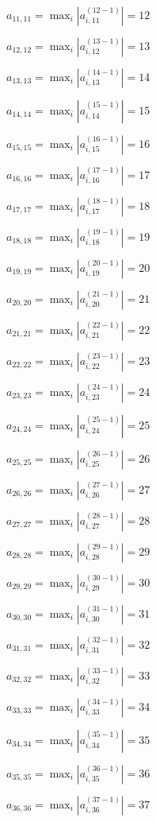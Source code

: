 \documentclass[a4paper,12pt]{article}
\begin{document}
$a _{ 11, 11 } =  \max _i |a _{ i, 11 } ^{ (12 - 1) } | = 12$

$a _{ 12, 12 } =  \max _i |a _{ i, 12 } ^{ (13 - 1) } | = 13$

$a _{ 13, 13 } =  \max _i |a _{ i, 13 } ^{ (14 - 1) } | = 14$

$a _{ 14, 14 } =  \max _i |a _{ i, 14 } ^{ (15 - 1) } | = 15$

$a _{ 15, 15 } =  \max _i |a _{ i, 15 } ^{ (16 - 1) } | = 16$

$a _{ 16, 16 } =  \max _i |a _{ i, 16 } ^{ (17 - 1) } | = 17$

$a _{ 17, 17 } =  \max _i |a _{ i, 17 } ^{ (18 - 1) } | = 18$

$a _{ 18, 18 } =  \max _i |a _{ i, 18 } ^{ (19 - 1) } | = 19$

$a _{ 19, 19 } =  \max _i |a _{ i, 19 } ^{ (20 - 1) } | = 20$

$a _{ 20, 20 } =  \max _i |a _{ i, 20 } ^{ (21 - 1) } | = 21$

$a _{ 21, 21 } =  \max _i |a _{ i, 21 } ^{ (22 - 1) } | = 22$

$a _{ 22, 22 } =  \max _i |a _{ i, 22 } ^{ (23 - 1) } | = 23$

$a _{ 23, 23 } =  \max _i |a _{ i, 23 } ^{ (24 - 1) } | = 24$

$a _{ 24, 24 } =  \max _i |a _{ i, 24 } ^{ (25 - 1) } | = 25$

$a _{ 25, 25 } =  \max _i |a _{ i, 25 } ^{ (26 - 1) } | = 26$

$a _{ 26, 26 } =  \max _i |a _{ i, 26 } ^{ (27 - 1) } | = 27$

$a _{ 27, 27 } =  \max _i |a _{ i, 27 } ^{ (28 - 1) } | = 28$

$a _{ 28, 28 } =  \max _i |a _{ i, 28 } ^{ (29 - 1) } | = 29$

$a _{ 29, 29 } =  \max _i |a _{ i, 29 } ^{ (30 - 1) } | = 30$

$a _{ 30, 30 } =  \max _i |a _{ i, 30 } ^{ (31 - 1) } | = 31$

$a _{ 31, 31 } =  \max _i |a _{ i, 31 } ^{ (32 - 1) } | = 32$

$a _{ 32, 32 } =  \max _i |a _{ i, 32 } ^{ (33 - 1) } | = 33$

$a _{ 33, 33 } =  \max _i |a _{ i, 33 } ^{ (34 - 1) } | = 34$

$a _{ 34, 34 } =  \max _i |a _{ i, 34 } ^{ (35 - 1) } | = 35$

$a _{ 35, 35 } =  \max _i |a _{ i, 35 } ^{ (36 - 1) } | = 36$

$a _{ 36, 36 } =  \max _i |a _{ i, 36 } ^{ (37 - 1) } | = 37$
\end{document}
